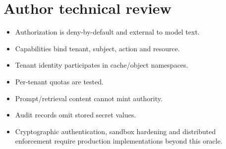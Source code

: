 \chapter*{Author technical review}
\begin{itemize}
\item Authorization is deny-by-default and external to model text.
\item Capabilities bind tenant, subject, action and resource.
\item Tenant identity participates in cache/object namespaces.
\item Per-tenant quotas are tested.
\item Prompt/retrieval content cannot mint authority.
\item Audit records omit stored secret values.
\item Cryptographic authentication, sandbox hardening and distributed enforcement require production implementations beyond this oracle.
\end{itemize}